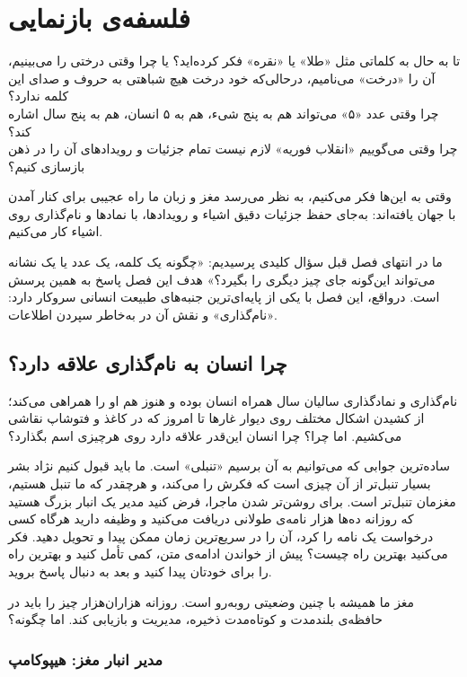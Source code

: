 \chapter{فلسفه‌ی بازنمایی}
\label{ch:philosophy-of-representation}

تا به حال به کلماتی مثل «طلا» یا «نقره» فکر کرده‌اید؟ یا چرا وقتی درختی را می‌بینیم، آن را «درخت» می‌نامیم، درحالی‌که خود درخت هیچ شباهتی به حروف و صدای این کلمه ندارد؟\\
چرا وقتی عدد «۵» می‌تواند هم به پنج شیء، هم به ۵ انسان، هم به پنج سال اشاره کند؟\\
چرا وقتی می‌گوییم «انقلاب فوریه» لازم نیست تمام جزئیات و رویدادهای آن را در ذهن بازسازی کنیم؟

وقتی به این‌ها فکر می‌کنیم، به نظر می‌رسد مغز و زبان ما راه عجیبی برای کنار آمدن با جهان یافته‌اند: به‌جای حفظ جزئیات دقیق اشیاء و رویدادها، با نماد‌ها و نام‌گذاری روی اشیاء کار می‌کنیم.

ما در انتهای فصل قبل سؤال کلیدی پرسیدیم: «چگونه یک کلمه، یک عدد یا یک نشانه می‌تواند این‌گونه جای چیز دیگری را بگیرد؟» هدف این فصل پاسخ به همین پرسش است. درواقع، این فصل با یکی از پایه‌ای‌ترین جنبه‌های طبیعت انسانی سروکار دارد: «نام‌گذاری» و نقش آن در به‌خاطر سپردن اطلاعات.
\newpage
\section{چرا انسان به نام‌گذاری علاقه دارد؟}
\label{sec:why-naming}

نام‌گذاری و نمادگذاری سالیان سال همراه انسان بوده و هنوز هم او را همراهی می‌کند؛ از کشیدن اشکال مختلف روی دیوار غارها تا امروز که در کاغذ و فتوشاپ نقاشی می‌کشیم. اما چرا؟ چرا انسان این‌قدر علاقه دارد روی هرچیزی اسم بگذارد؟

ساده‌ترین جوابی که می‌توانیم به آن برسیم «تنبلی» است. ما باید قبول کنیم نژاد بشر بسیار تنبل‌تر از آن چیزی است که فکرش را می‌کند، و هرچقدر که ما تنبل هستیم، مغزمان تنبل‌تر است. برای روشن‌تر شدن ماجرا، فرض کنید مدیر یک انبار بزرگ هستید که روزانه ده‌ها هزار نامه‌ی طولانی دریافت می‌کنید و وظیفه دارید هرگاه کسی درخواست یک نامه را کرد، آن را در سریع‌ترین زمان ممکن پیدا و تحویل دهید. فکر می‌کنید بهترین راه چیست؟ پیش از خواندن ادامه‌ی متن، کمی تأمل کنید و بهترین راه را برای خودتان پیدا کنید و بعد به دنبال پاسخ بروید.

مغز ما همیشه با چنین وضعیتی روبه‌رو است. روزانه هزاران‌هزار چیز را باید در حافظه‌ی بلندمدت و کوتاه‌مدت ذخیره، مدیریت و بازیابی کند. اما چگونه؟

\subsection{مدیر انبار مغز: هیپوکامپ}
\label{sub:hippocampus-warehouse-manager}

